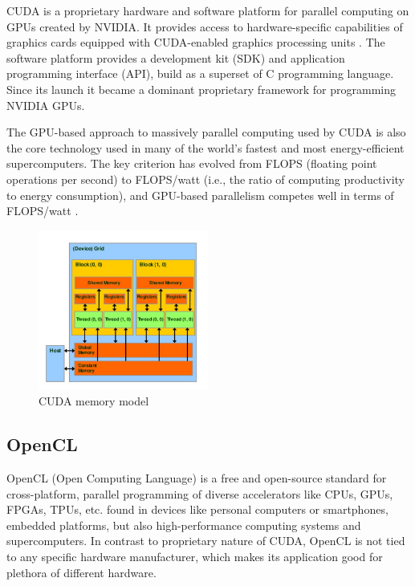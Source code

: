 CUDA is a proprietary hardware and software platform for parallel computing on GPUs created by NVIDIA. It provides access to hardware-specific capabilities of graphics cards equipped with CUDA-enabled graphics processing units \cite{stortiCUDAEngineersIntroduction2016}. The software platform provides a development kit (SDK) and application programming interface (API), build as a superset of C programming language. Since its launch it became a dominant proprietary framework for programming NVIDIA GPUs.

The GPU-based approach to massively parallel computing used by CUDA is also the core technology used in many of the world’s fastest and most energy-efficient supercomputers. The key criterion has evolved from FLOPS (floating point operations per second) to FLOPS/watt (i.e., the ratio of computing productivity to energy consumption), and GPU-based parallelism competes well in terms of FLOPS/watt \citep{stortiCUDAEngineersIntroduction2016}.

\begin{figure}[!ht]
	\centering
	\includegraphics[width=0.5\textwidth]{figures/cuda-device-memory.jpg}
	\caption{CUDA memory model}
	\label{fig:cuda-memory-model}
\end{figure}

\subsection{OpenCL}

OpenCL (Open Computing Language) is a free and open-source standard for cross-platform, parallel programming of diverse accelerators like CPUs, GPUs, FPGAs, TPUs, etc. found in devices like personal computers or smartphones, embedded platforms, but also high-performance computing systems and supercomputers. In contrast to proprietary nature of CUDA, OpenCL is not tied to any specific hardware manufacturer, which makes its application good for plethora of different hardware.

